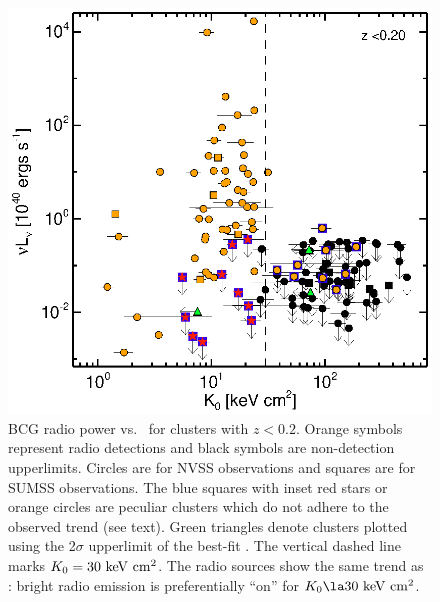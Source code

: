 \documentclass[12pt,preprint]{aastex}
\begin{document}
\clearpage
\begin{figure}
  \begin{center}
    \includegraphics*[width=\columnwidth, trim=28mm 7mm 40mm 17mm, clip]{f2.eps}
    \caption{BCG radio power vs. \kna\ for clusters with $z <
      0.2$. Orange symbols represent radio detections and black
      symbols are non-detection upperlimits. Circles are for NVSS
      observations and squares are for SUMSS observations. The blue
      squares with inset red stars or orange circles are peculiar
      clusters which do not adhere to the observed trend (see text).
      Green triangles denote clusters plotted using the 2$\sigma$
      upperlimit of the best-fit \kna. The vertical dashed line marks
      $K_0 = 30 \mathrm{\mbox{\ensuremath{\mathrm{~keV}}} \mathrm{\mbox{\ensuremath{\mathrm{~cm}}}^2}}$. The radio sources show the same trend as
      \halpha: bright radio emission is preferentially ``on'' for
      $\kna \la 30 \ent$.}
    \label{fig:radzcut}
  \end{center}
\end{figure}
\end{document}
